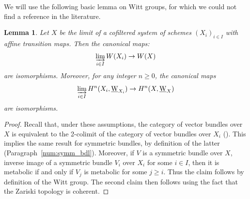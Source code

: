\documentclass[JEP,XML,SOM,Unicode]{cedram}
\newcommand{\uW}{\underline{\mathrm W}}
\DeclareMathOperator{\ilim}{\varinjlim}
\newtheorem{lm}[thm]{Lemma}
\theoremstyle{remark}
\theoremstyle{definition}
\numberwithin{equation}{thm}
\begin{document}
We will use the following basic lemma on Witt groups,
for which we could not find a reference in the literature.
\begin{lm}\label{lm:Witt_lim}
Let $X$ be the limit of a cofiltered system of schemes $(X_i)_{i \in I}$ with affine transition maps. Then the canonical maps:
\[
\ilim_{i \in I} W(X_i) \to W(X)
\]
are isomorphisms.
Moreover, for any integer $n \geqslant 0$, the canonical maps
\begin{equation*}\label{eq:unramf_Witt_coh&lim}
\ilim_{i \in I} H^n(X_i,\uW_{X_i}) \to H^n(X,\uW_X)
\end{equation*}
are isomorphisms.
\end{lm}
\begin{proof}
Recall that, under these assumptions, the category of vector bundles over~$X$ is equivalent to the 2-colimit of the category of vector bundles over $X_i$ (\cite[8.5.3--8.5.5]{EGA4}).
This implies the same result for symmetric bundles, by definition of the latter (Paragraph~\ref{num:symm_bdl}).
Moreover, if $V$ is a symmetric bundle over $X$, inverse image of a symmetric bundle $V_i$ over $X_i$ for some $i\in I$, then it is metabolic if and only if $V_j$ is metabolic for some $j\ge i$.
Thus the claim follows by definition of the Witt group.
The second claim then follows using the fact that the Zariski topology is coherent.
\end{proof}
\end{document}
